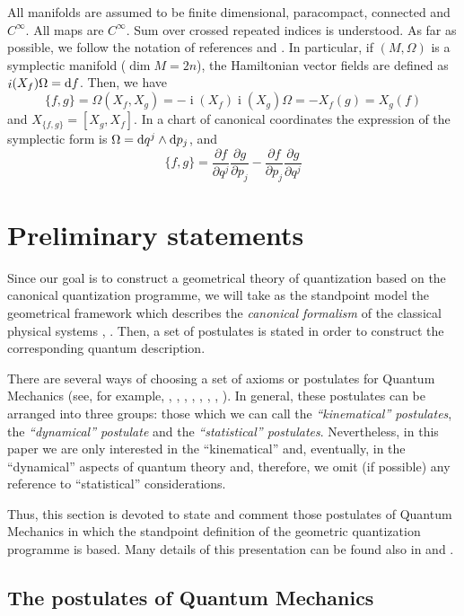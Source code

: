 \documentclass[12pt]{article}
\theoremstyle{plain}
\def\derpar#1#2{\frac{\partial{#1}}{\partial{#2}}}
\def\d{{\rm d}}
\def\inn{\mathop{i}\nolimits}
\begin{document}
All manifolds are assumed to be finite dimensional,
paracompact, connected and $C^\infty$. All maps are $C^\infty$.
Sum over crossed repeated indices is understood.
As far as possible, we follow the notation of references
\cite{AM-78} and \cite{AMR-mtaa}.
In particular, if $(M,\Omega )$ is a symplectic manifold ($\dim M =
2n$),
the Hamiltonian vector fields are defined as $\inn(X_f)\Omega = \d f$.
Then, we have
$$
\{ f,g \} = \Omega (X_f,X_g) =-\inn(X_f)\inn(X_g)\Omega =-X_f(g) =
X_g(f)
$$
and $X_{\{f,g\}} =[X_g,X_f]$.
In a chart of canonical coordinates the expression of the symplectic
form is
$\Omega = \d q^j \wedge \d p_j$, and
$$
\{ f,g \} =
\derpar{f}{q^j}\derpar{g}{p_j}-\derpar{f}{p_j}\derpar{g}{q^j}
$$



\section{Preliminary statements}


Since our goal is to construct a geometrical theory
of quantization based on the canonical quantization programme,
we will take as the standpoint model
the geometrical framework which describes the {\it canonical formalism}
of the classical physical systems  \cite{AM-78}, \cite{Ar-mmmc}.
Then, a set of postulates is stated in order to construct
the corresponding quantum description.

There are several ways of choosing a set of axioms
or postulates for Quantum Mechanics (see, for example,
\cite{CDL-77}, \cite{Di-pqm}, \cite{GP-78}, \cite{Ja-fqm},
\cite{Mk-mfqm},
\cite{Mo-qmdo}, \cite{Se-pgqm}, \cite{Vn-mfqm}).
In general, these postulates can be arranged into three groups:
those which we can call the {\it ``kinematical'' postulates},
the {\it``dynamical'' postulate} and the {\it ``statistical''
postulates}.
Nevertheless, in this paper we are only interested in the
``kinematical'' and,
eventually, in the ``dynamical'' aspects of quantum theory
and, therefore, we omit (if possible) any reference to ``statistical''
considerations.

Thus, this section is devoted to state and comment
those postulates of Quantum Mechanics in which the standpoint
definition of the geometric quantization programme is based.
Many details of this presentation can be found also in
\cite{Ki-gq} and \cite{Tu-96}.



\subsection{The postulates of Quantum Mechanics}
\end{document}
